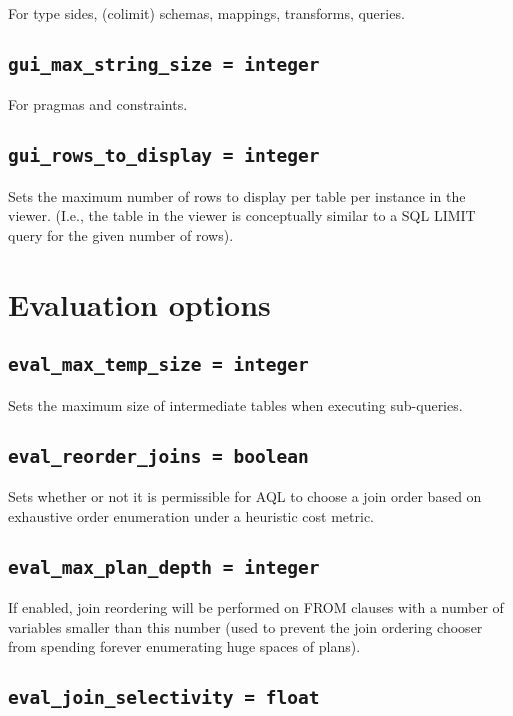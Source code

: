 \documentclass[10pt]{book}
\begin{document}
For type sides, (colimit) schemas, mappings, transforms, queries.

\subsection{{\tt gui\_max\_string\_size = integer}}

For pragmas and constraints.

\subsection{{\tt gui\_rows\_to\_display = integer}}

Sets the maximum number of rows to display per table per instance in the viewer.  (I.e., the table in the viewer is conceptually similar to a SQL LIMIT query for the given number of rows).

\section{Evaluation options}

\subsection{{\tt eval\_max\_temp\_size = integer}}

Sets the maximum size of intermediate tables when executing sub-queries.

\subsection{{\tt eval\_reorder\_joins = boolean}}

Sets whether or not it is permissible for AQL to choose a join order based on exhaustive order enumeration under a heuristic cost metric.

\subsection{{\tt eval\_max\_plan\_depth = integer}}

If enabled, join reordering will be performed on FROM clauses with a number of variables smaller than this number (used to prevent the join ordering chooser from spending forever enumerating huge spaces of plans).

\subsection{{\tt eval\_join\_selectivity = float}}
\end{document}
